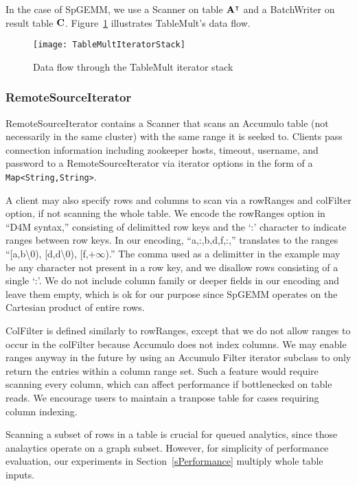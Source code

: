 In the case of SpGEMM, we use a Scanner on table $\mathbf{A^{\intercal}}$
and a BatchWriter on result table $\mathbf{C}$.
Figure~\ref{fIteratorStackSpGEMM} illustrates TableMult's data flow.

\begin{figure}[htb]
\centering
\texttt{[image: TableMultIteratorStack]}
\caption{Data flow through the TableMult iterator stack}
\label{fIteratorStackSpGEMM}
\end{figure}

\subsubsection{RemoteSourceIterator}
RemoteSourceIterator contains a Scanner that scans an Accumulo table
(not necessarily in the same cluster) with the same range it is seeked to.
Clients pass connection information including zookeeper hosts, timeout,
username, and password to a RemoteSourceIterator via iterator options
in the form of a \texttt{Map<String,String>}.

A client may also specify rows and columns to scan via a rowRanges and colFilter option, 
if not scanning the whole table. We encode the rowRanges option in ``D4M syntax,'' consisting of 
delimitted row keys and the `:' character to indicate ranges between row keys.
In our encoding, ``a,:,b,d,f,:,'' translates to the ranges 
``[a,b\textbackslash{}0), [d,d\textbackslash{}0), [f,$+\infty$).'' The comma used as a delimitter in the example 
may be any character not present in a row key, and we disallow rows consisting of a single `:'.
We do not include column family or deeper fields in our encoding and leave them empty, 
which is ok for our purpose since SpGEMM operates on the Cartesian product of entire rows.

ColFilter is defined similarly to rowRanges, except that we do not allow ranges to occur in the colFilter
because Accumulo does not index columns.  We may enable ranges anyway in the future by using an Accumulo
Filter iterator subclass to only return the entries within a column range set.
Such a feature would require scanning every column, 
which can affect performance if bottlenecked on table reads.
We encourage users to maintain a tranpose table for cases requiring column indexing.

Scanning a subset of rows in a table is crucial for queued analytics, since those analaytics 
operate on a graph subset.  However, for simplicity of performance evaluation, 
our experiments in Section~\ref{sPerformance} multiply whole table inputs.

